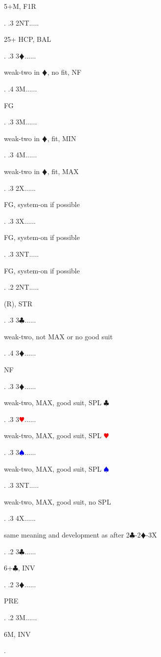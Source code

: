 \documentclass[a4paper]{article}
\newcommand{\BC}{\textcolor{OliveGreen}{$\clubsuit$}}
\newcommand{\BD}{\textcolor{RedOrange}{$\vardiamondsuit$}}
\newcommand{\BH}{\textcolor{Red}{$\varheartsuit${}}}
\newcommand{\BS}{\textcolor{Blue}{$\spadesuit${}}}
\begin{document}
{\begin{minipage}[t]{0.8\textwidth}
5+M, F1R
\end{minipage}. 
 .3 2NT.....\begin{minipage}[t]{0.8\textwidth}
25+ HCP, BAL
\end{minipage}. 
 .3 3\BD......\begin{minipage}[t]{0.8\textwidth}
weak-two in \BD , no fit, NF
\end{minipage}. 
 .4 3M......\begin{minipage}[t]{0.8\textwidth}
FG
\end{minipage}. 
 .3 3M......\begin{minipage}[t]{0.8\textwidth}
weak-two in \BD , fit, MIN
\end{minipage}. 
 .3 4M......\begin{minipage}[t]{0.8\textwidth}
weak-two in \BD , fit, MAX
\end{minipage}. 
 .3 2X......\begin{minipage}[t]{0.8\textwidth}
FG, system-on if possible
\end{minipage}. 
 .3 3X......\begin{minipage}[t]{0.8\textwidth}
FG, system-on if possible
\end{minipage}. 
 .3 3NT.....\begin{minipage}[t]{0.8\textwidth}
FG, system-on if possible
\end{minipage}. 
 .2 2NT.....\begin{minipage}[t]{0.8\textwidth}
(R), STR
\end{minipage}. 
 .3 3\BC......\begin{minipage}[t]{0.8\textwidth}
weak-two, not MAX or no good suit
\end{minipage}. 
 .4 3\BD......\begin{minipage}[t]{0.8\textwidth}
NF
\end{minipage}. 
 .3 3\BD......\begin{minipage}[t]{0.8\textwidth}
weak-two, MAX, good suit, SPL \BC 
\end{minipage}. 
 .3 3\BH......\begin{minipage}[t]{0.8\textwidth}
weak-two, MAX, good suit, SPL \BH 
\end{minipage}. 
 .3 3\BS......\begin{minipage}[t]{0.8\textwidth}
weak-two, MAX, good suit, SPL \BS 
\end{minipage}. 
 .3 3NT.....\begin{minipage}[t]{0.8\textwidth}
weak-two, MAX, good suit, no SPL
\end{minipage}. 
 .3 4X......\begin{minipage}[t]{0.8\textwidth}
same meaning and development as after 2\BC -2\BD -3X
\end{minipage}. 
 .2 3\BC......\begin{minipage}[t]{0.8\textwidth}
6+\BC , INV
\end{minipage}. 
 .2 3\BD......\begin{minipage}[t]{0.8\textwidth}
PRE
\end{minipage}. 
 .2 3M......\begin{minipage}[t]{0.8\textwidth}
6M, INV
\end{minipage}. 
}
\bigbreak
\end{document}
